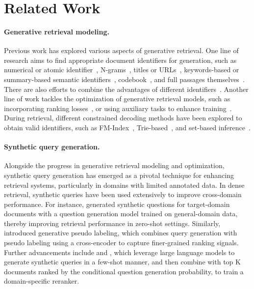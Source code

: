 \section{Related Work}

\paragraph{Generative retrieval modeling.}
Previous work has explored various aspects of generative retrieval. One line of research aims to find appropriate document identifiers for generation, such as numerical or atomic identifier~\citep{DBLP:conf/nips/Tay00NBM000GSCM22,DBLP:journals/corr/abs-2206-10128,DBLP:journals/corr/abs-2208-09257}, N-grams~\citep{DBLP:conf/nips/BevilacquaOLY0P22,DBLP:conf/sigir/Chen0GR0FC23}, titles or URLs~\citep{DBLP:journals/ipm/LiYWWL23,lee-etal-2022-generative,DBLP:conf/cikm/ChenZG0FC22,ziems-etal-2023-large}, keywords-based or summary-based semantic identifiers~\citep{lee-etal-2023-glen,DBLP:conf/kdd/Tang0GCZWYC23}, codebook~\citep{DBLP:conf/nips/ZhangWCCZMHDMWP23,yang-etal-2023-auto,DBLP:conf/www/Zeng0JSWZ24}, and full passages themselves~\citep{tang2024selfretrievalendtoendinformationretrieval}. There are also efforts to combine the advantages of different identifiers~\citep{li-etal-2023-multiview}. Another line of work tackles the optimization of generative retrieval models, such as incorporating ranking losses~\citep{zhou-etal-2023-enhancing-generative,DBLP:conf/aaai/00010WWL24,DBLP:journals/tois/TangZGRCC24}, or using auxiliary tasks to enhance training~\citep{DBLP:conf/sigir/LiD0L24}. During retrieval, different constrained decoding methods have been explored to obtain valid identifiers, such as FM-Index~\citep{DBLP:conf/nips/BevilacquaOLY0P22}, Trie-based~\citep{DBLP:journals/corr/abs-2010-00904}, and set-based inference~\citep{DBLP:journals/tois/TangZGRCC24}.

\paragraph{Synthetic query generation.}
Alongside the progress in generative retrieval modeling and optimization, synthetic query generation has emerged as a pivotal technique for enhancing retrieval systems, particularly in domains with limited annotated data.
In dense retrieval, synthetic queries have been used extensively to improve cross-domain performance.
For instance, \citet{ma2021zero} generated synthetic questions for target-domain documents with a question generation model trained on general-domain data, thereby improving retrieval performance in zero-shot settings.
Similarly, \citet{wang2022gpl} introduced generative pseudo labeling, which combines query generation with pseudo labeling using a cross-encoder to capture finer-grained ranking signals.
Further advancements include \citet{bonifacio2022inpars} and \citet{jeronymo2023inpars}, which leverage large language models to generate synthetic queries in a few-shot manner, and then combine with top K documents ranked by the conditional question generation probability, to train a domain-specific reranker.

